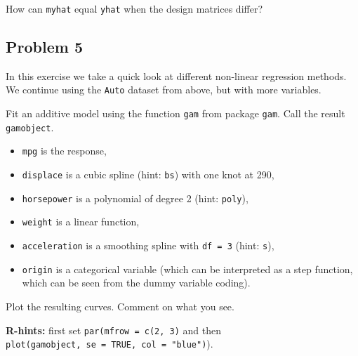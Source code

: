 \documentclass[
]{article}
\newenvironment{Shaded}{\begin{snugshade}}{\end{snugshade}}
\newcommand{\AttributeTok}[1]{\textcolor[rgb]{0.13,0.29,0.53}{#1}}
\newcommand{\CommentTok}[1]{\textcolor[rgb]{0.56,0.35,0.01}{\textit{#1}}}
\newcommand{\DecValTok}[1]{\textcolor[rgb]{0.00,0.00,0.81}{#1}}
\newcommand{\FunctionTok}[1]{\textcolor[rgb]{0.13,0.29,0.53}{\textbf{#1}}}
\newcommand{\NormalTok}[1]{#1}
\newcommand{\OtherTok}[1]{\textcolor[rgb]{0.56,0.35,0.01}{#1}}
\newcommand{\SpecialCharTok}[1]{\textcolor[rgb]{0.81,0.36,0.00}{\textbf{#1}}}
\providecommand{\tightlist}{%
  \setlength{\itemsep}{0pt}\setlength{\parskip}{0pt}}
\begin{document}
\begin{Shaded}
\end{Shaded}

How can \texttt{myhat} equal \texttt{yhat} when the design matrices
differ?

\subsection{Problem 5}\label{problem-5}

In this exercise we take a quick look at different non-linear regression
methods. We continue using the \texttt{Auto} dataset from above, but
with more variables.

Fit an additive model using the function \texttt{gam} from package
\texttt{gam}. Call the result \texttt{gamobject}.

\begin{itemize}
\tightlist
\item
  \texttt{mpg} is the response,
\item
  \texttt{displace} is a cubic spline (hint: \texttt{bs}) with one knot
  at 290,
\item
  \texttt{horsepower} is a polynomial of degree 2 (hint: \texttt{poly}),
\item
  \texttt{weight} is a linear function,
\item
  \texttt{acceleration} is a smoothing spline with \texttt{df\ =\ 3}
  (hint: \texttt{s}),
\item
  \texttt{origin} is a categorical variable (which can be interpreted as
  a step function, which can be seen from the dummy variable coding).
\end{itemize}

Plot the resulting curves. Comment on what you see.

\textbf{R-hints:} first set \texttt{par(mfrow\ =\ c(2,\ 3)} and then
\texttt{plot(gamobject,\ se\ =\ TRUE,\ col\ =\ "blue")}).
\end{document}
